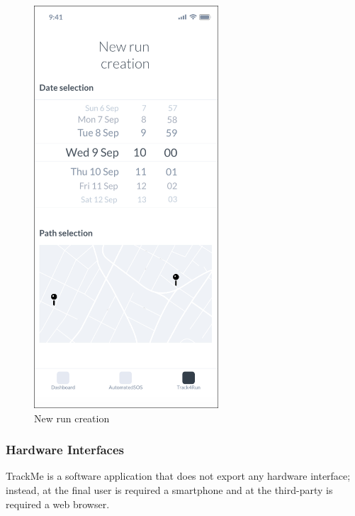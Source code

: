 \documentclass{article}
\begin{document}
	\begin{figure}[!h]
	 	\centering
		\includegraphics[height=15cm,keepaspectratio]{Figures/8Path}
		\caption{New run creation}
	\end{figure}\newpage	
	
	\newpage
	\subsubsection{Hardware Interfaces}
	TrackMe is a software application that does not export any 
	hardware interface; instead, at the final user is required a 
	smartphone and at the third-party is required a web browser. 
			
\end{document}
